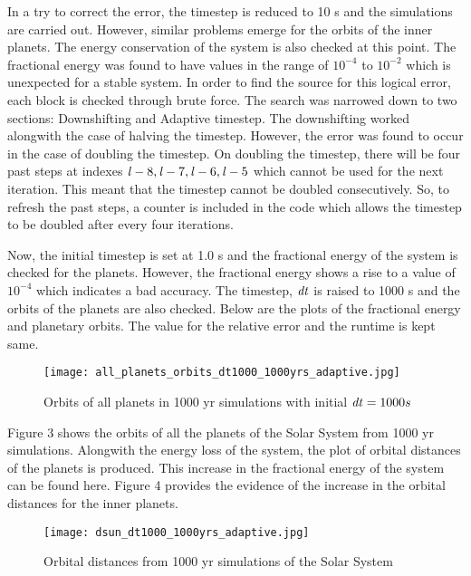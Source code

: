 \documentclass[11pt]{article}
\begin{document}
{{\bigskip
In a try to correct the error, the timestep is reduced to 10 s and the simulations are carried out. However, similar problems emerge for the orbits of the inner planets. The energy conservation of the system is also checked at this point. The fractional energy was found to have values in the range of $10^{-4}$ to $10^{-2}$ which is unexpected for a stable system. In order to find the source for this logical error, each block is checked through brute force. The search was narrowed down to two sections: Downshifting and Adaptive timestep. The downshifting worked alongwith the case of halving the timestep. However, the error was found to occur in the case of doubling the timestep. On doubling the timestep, there will be four past steps at indexes ${\it l}-8, {\it l}-7, {\it l}-6, {\it l}-5$ which cannot be used for the next iteration. This meant that the timestep cannot be doubled consecutively. So, to refresh the past steps, a counter is included in the code which allows the timestep to be doubled after every four iterations.
\medskip

Now, the initial timestep is set at 1.0 s and the fractional energy of the system is checked for the planets. However, the fractional energy shows a rise to a value of $10^{-4}$ which indicates a bad accuracy.  The timestep, $\it dt$ is raised to 1000 s and the orbits of the planets are also checked. Below are the plots of the fractional energy and planetary orbits. The value for the relative error and the runtime is kept same. 
\begin{figure} [h]
\texttt{[image: all\_planets\_orbits\_dt1000\_1000yrs\_adaptive.jpg]}
\centering
\caption{Orbits of all planets in 1000 yr simulations with initial ${\it dt}= 1000 s$}
\centering
\end{figure}

Figure 3 shows the orbits of all the planets of the Solar System from 1000 yr simulations. Alongwith the energy loss of the system, the plot of orbital distances of the planets is produced. This increase in the fractional energy of the system can be found here. Figure 4 provides the evidence of the increase in the orbital distances for the inner planets. 
\medskip

\begin{figure} [h]
\texttt{[image: dsun\_dt1000\_1000yrs\_adaptive.jpg]}
\centering
\caption{Orbital distances from 1000 yr simulations of the Solar System}
\centering
\end{figure}

}}
\end{document}
